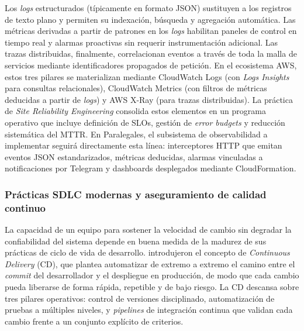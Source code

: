 Los \textit{logs} estructurados (típicamente en formato JSON) sustituyen a los registros de texto plano y permiten su indexación, búsqueda y agregación automática. Las métricas derivadas a partir de patrones en los \textit{logs} habilitan paneles de control en tiempo real y alarmas proactivas sin requerir instrumentación adicional. Las trazas distribuidas, finalmente, correlacionan eventos a través de toda la malla de servicios mediante identificadores propagados de petición. En el ecosistema AWS, estos tres pilares se materializan mediante CloudWatch Logs (con \textit{Logs Insights} para consultas relacionales), CloudWatch Metrics (con filtros de métricas deducidas a partir de \textit{logs}) y AWS X-Ray (para trazas distribuidas). La práctica de \textit{Site Reliability Engineering} \cite{Beyer2016} consolida estos elementos en un programa operativo que incluye definición de SLOs, gestión de \textit{error budgets} y reducción sistemática del MTTR. En Paralegales, el subsistema de observabilidad a implementar seguirá directamente esta línea: interceptores HTTP que emitan eventos JSON estandarizados, métricas deducidas, alarmas vinculadas a notificaciones por Telegram y dashboards desplegados mediante CloudFormation.

\subsubsection{Prácticas SDLC modernas y aseguramiento de calidad continuo}

La capacidad de un equipo para sostener la velocidad de cambio sin degradar la confiabilidad del sistema depende en buena medida de la madurez de sus prácticas de ciclo de vida de desarrollo. \textcite{Humble2010} introdujeron el concepto de \textit{Continuous Delivery} (CD), que plantea automatizar de extremo a extremo el camino entre el \textit{commit} del desarrollador y el despliegue en producción, de modo que cada cambio pueda liberarse de forma rápida, repetible y de bajo riesgo. La CD descansa sobre tres pilares operativos: control de versiones disciplinado, automatización de pruebas a múltiples niveles, y \textit{pipelines} de integración continua que validan cada cambio frente a un conjunto explícito de criterios.

